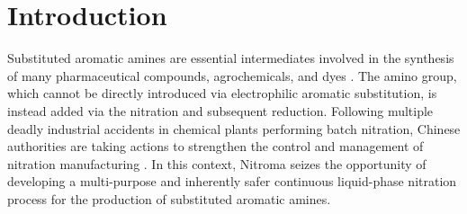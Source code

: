 \section{Introduction}
\label{sec:introduction}

Substituted aromatic amines are essential intermediates involved in the synthesis of many pharmaceutical compounds, agrochemicals, and dyes \cite{vogt_amines_2000}. The amino group, which cannot be directly introduced via electrophilic aromatic substitution, is instead added via the nitration and subsequent reduction.
Following multiple deadly industrial accidents in chemical plants performing batch nitration, Chinese authorities are taking actions to strengthen the control and management of nitration manufacturing \cite{noauthor_china_2019}.
In this context, Nitroma seizes the opportunity of developing a multi-purpose and inherently safer continuous liquid-phase nitration process for the production of substituted aromatic  amines. 

\begin{comment}
Substituted aromatic amines are essential intermediates involved in the synthesis of many pharmaceutical compounds, agrochemicals, and dyes \cite{vogt_amines_2000}. The easy replacement of the amino group by other functional groups makes them very attractive versatile intermediates. The amino group, which cannot be directly introduced via electrophilic aromatic substitution, is instead added via the nitration of the aromatic ring, followed by reduction.

Following multiple deadly industrial accidents in chemical plants performing batch nitration, especially the 2019 Xiangshui chemical plant explosion, Chinese authorities are taking actions to strengthen the control and management of nitration manufacturing. Inspections and in-depth risk assessments are expected to be conducted to ensure compliance of the plants with the regulations on dangerous chemicals \cite{noauthor_china_2019}.

In this context, Nitroma seizes the opportunity of developing a multi-purpose and continuous liquid phase nitration process for the conversion of substituted aromatics to their respective nitrates and subsequently to their amines. 
\end{comment}